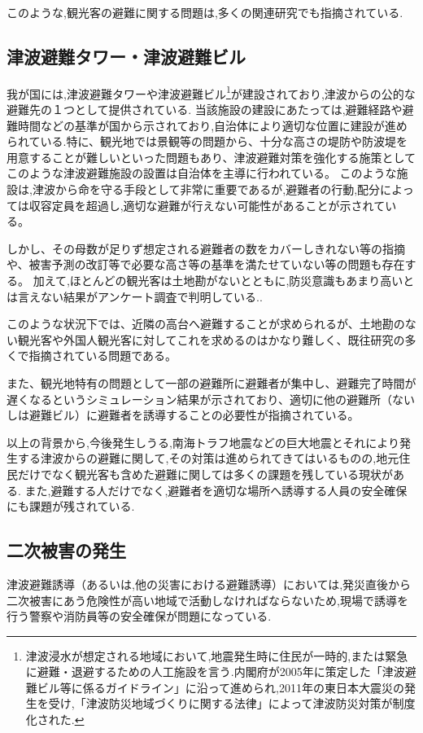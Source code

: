 このような,観光客の避難に関する問題は,多くの関連研究でも指摘されている.

\subsection{津波避難タワー・津波避難ビル}
我が国には,津波避難タワーや津波避難ビル\footnote{津波浸水が想定される地域において,地震発生時に住民が一時的,または緊急に避難・退避するための人工施設を言う.内閣府が2005年に策定した「津波避難ビル等に係るガイドライン」に沿って進められ,2011年の東日本大震災の発生を受け,「津波防災地域づくりに関する法律」によって津波防災対策が制度化された.}が建設されており,津波からの公的な避難先の１つとして提供されている.
当該施設の建設にあたっては,避難経路や避難時間などの基準が国から示されており,自治体により適切な位置に建設が進められている.特に、観光地では景観等の問題から、十分な高さの堤防や防波堤を用意することが難しいといった問題もあり、津波避難対策を強化する施策としてこのような津波避難施設の設置は自治体を主導に行われている。
このような施設は,津波から命を守る手段として非常に重要であるが,避難者の行動,配分によっては収容定員を超過し,適切な避難が行えない可能性があることが示されている\cite{kouti-01}。\par 

しかし、その母数が足りず想定される避難者の数をカバーしきれない等の指摘や、被害予測の改訂等で必要な高さ等の基準を満たせていない等の問題も存在する\cite{tsunami_evacuation_koshigoe}。
加えて,ほとんどの観光客は土地勘がないとともに,防災意識もあまり高いとは言えない結果がアンケート調査で判明している.\cite{visitor01}.

このような状況下では、近隣の高台へ避難することが求められるが、土地勘のない観光客や外国人観光客に対してこれを求めるのはかなり難しく、既往研究の多くで指摘されている問題である。\par 

また、観光地特有の問題として一部の避難所に避難者が集中し、避難完了時間が遅くなるというシミュレーション結果が示されており、適切に他の避難所（ないしは避難ビル）に避難者を誘導することの必要性が指摘されている\cite{kitahara2013tsunami}。


\vspace{\baselineskip}
以上の背景から,今後発生しうる,南海トラフ地震などの巨大地震とそれにより発生する津波からの避難に関して,その対策は進められてきてはいるものの,地元住民だけでなく観光客も含めた避難に関しては多くの課題を残している現状がある.
また,避難する人だけでなく,避難者を適切な場所へ誘導する人員の安全確保にも課題が残されている.


\subsection{二次被害の発生}
津波避難誘導（あるいは,他の災害における避難誘導）においては,発災直後から二次被害にあう危険性が高い地域で活動しなければならないため,現場で誘導を行う警察や消防員等の安全確保が問題になっている.\par
